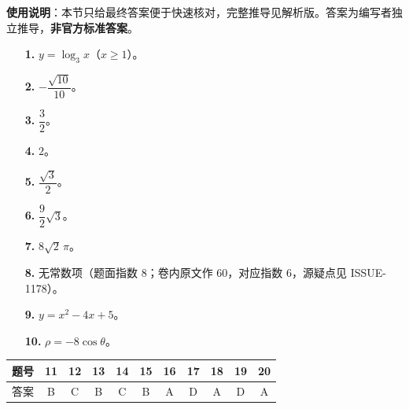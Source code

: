 
\begin{gknotice}
\textbf{使用说明}：本节只给最终答案便于快速核对，完整推导见解析版。答案为编写者独立推导，\textbf{非官方标准答案}。
\end{gknotice}

\begin{itemize}[leftmargin=2.6em]
  \item[\textbf{1.}] $y=\log_{3}x$（$x\ge 1$）。
  \item[\textbf{2.}] $-\dfrac{\sqrt{10}}{10}$。
  \item[\textbf{3.}] $\dfrac{3}{2}$。
  \item[\textbf{4.}] $2$。
  \item[\textbf{5.}] $\dfrac{\sqrt{3}}{2}$。
  \item[\textbf{6.}] $\dfrac{9}{2}\sqrt{3}$。
  \item[\textbf{7.}] $8\sqrt{2}\,\pi$。
  \item[\textbf{8.}] 无常数项（题面指数 $8$；卷内原文作 $60$，对应指数 $6$，源疑点见 ISSUE-1178）。
  \item[\textbf{9.}] $y=x^{2}-4x+5$。
  \item[\textbf{10.}] $\rho=-8\cos\theta$。
\end{itemize}

\begin{center}\begin{tabular}{ccccccccccc}
\toprule
题号 & 11 & 12 & 13 & 14 & 15 & 16 & 17 & 18 & 19 & 20 \\
\midrule
答案 & B & C & B & C & B & A & D & A & D & A \\
\bottomrule
\end{tabular}\end{center}

